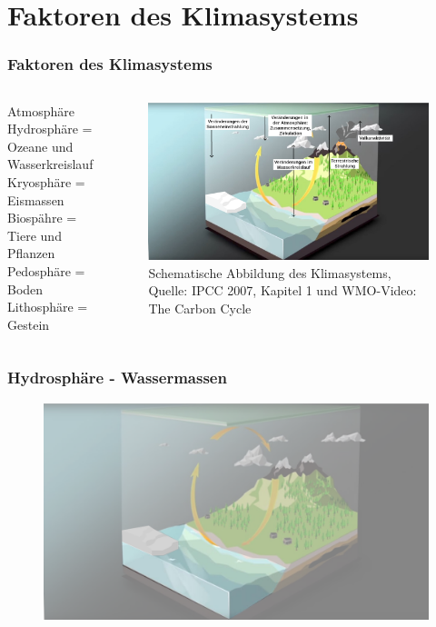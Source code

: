 \section{Faktoren des Klimasystems}


\begin{frame}
  \frametitle{Faktoren des Klimasystems}
  \begin{columns}
	Atmosphäre \\
	Hydrosphäre = Ozeane und Wasserkreislauf \\
	Kryosphäre = Eismassen \\
	Biospähre = Tiere und Pflanzen \\
	Pedosphäre = Boden \\
	Lithosphäre = Gestein 
	\begin{figure}
	 	\centering
	 	\includegraphics[width=0.8\linewidth]{bilder/WMO_Cycles_factors_general.png}
	 	\caption{Schematische Abbildung des Klimasystems, Quelle: IPCC 2007, Kapitel 1 und WMO-Video: The Carbon Cycle} %
	\end{figure}
	\end{columns}

\end{frame}


\begin{frame}
	\frametitle{Hydrosphäre - Wassermassen}
	\begin{figure}
		\centering
		\includegraphics{bilder/WMO_Cycles_water.png}
		\caption{}
	\end{figure}
\end{frame}


